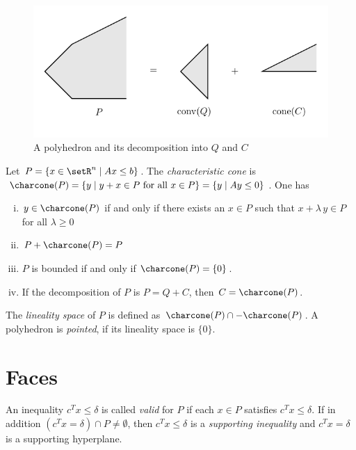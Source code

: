 \begin{figure}[htbp]
  \begin{center}
    \includegraphics{figures/PicPolyhedra1.pdf}
  \end{center}
  \caption{A polyhedron and its decomposition into $Q$ and $C$\label{po:fig:decomp}}
\end{figure}




Let $P = \{ x \in \setR^n \mid Ax\leq b\}$. The \emph{characteristic cone} is 
$\charcone(P) =\{ y \mid y+x \in P \text{ for all } x \in P\} = \{y \mid Ay
\leq0\}$. One has
\begin{enumerate}[i)]
\item $y \in \charcone(P)$ if and only if there exists an $x \in P$ such
  that $x + \lambda\,y \in P$ for all $\lambda\geq0$ 
\item $P + \charcone(P)=P$
\item $P$ is bounded if and only if $\charcone(P)=\{0\}$. 
\item If the decomposition of $P$ is $P = Q +C$, then $C = \charcone(P)$. 
\end{enumerate}



The \emph{lineality space} of $P$ is defined as $\charcone(P) \cap -
\charcone(P)$. A polyhedron is \emph{pointed}, if its lineality space is
$\{0\}$.






\section{Faces}
\label{po:sec:faces}

An inequality $c^Tx\leq\delta$    is called \emph{valid} for $P$ if each $x
\in P$ satisfies $c^Tx\leq\delta$. If in addition $(c^Tx = \delta) \cap P \neq\emptyset$,
then $c^Tx\leq\delta$ is a \emph{supporting inequality} and $c^Tx = \delta$ is a
supporting hyperplane. 

